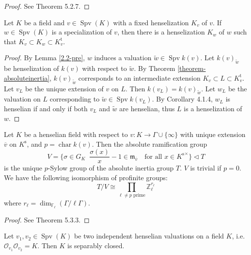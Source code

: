 \begin{proof}
See \cite{EP05} Theorem 5.2.7.
\end{proof}

\begin{lemma}\label{lemma-henselization-specialization}
Let $K$ be a field and $v\in\operatorname{Spv}(K)$ with a fixed henselization $K_v$ of $v$. If $w\in\operatorname{Spv}(K)$ is a specialization of $v$, then there is a henselization $K_w$ of $w$ such that $K_v\subset K_w\subset K_v^\text{t}$.
\end{lemma}

\begin{proof}
By Lemma \ref{2.2-pre}, $w$ induces a valuation $\tilde{w}\in\operatorname{Spv}k(v)$. Let $k(v)_{\tilde{w}}$ be henselization of $k(v)$ with respect to $\tilde{w}$. By Theorem \ref{theorem-absoluteinertia}, $k(v)_{\tilde{w}}$ corresponds to an intermediate extension $K_v\subset L \subset K^\text{t}_v$. Let $v_L$ be the unique extension of $v$ on $L$. Then $k(v_L)=k(v)_{\tilde{w}}$. Let $w_L$ be the valuation on $L$ corresponding to $\tilde{w}\in \operatorname{Spv} k(v_L)$. By \cite{EP05} Corollary 4.1.4, $w_L$ is henselian if and only if both $v_L$ and $\tilde{w}$ are henselian, thus $L$ is a henselization of $w$.
\end{proof}

\begin{theorem}\label{theorem-sylowgroups-inertiagroup}
Let $K$ be a henselian field with respect to $v:K\to\Gamma\cup\{\infty\}$ with unique extension $\overline{v}$ on $K^\text{s}$, and $p=\operatorname{char}k(v)$. Then the absolute ramification group
\[ V = \Big\{ \sigma\in G_K\mathop{\Big|} \frac{\sigma(x)}{x}-1\in\mathfrak{m}_{\overline{v}}\quad \text{for all }x\in {K^\text{s}}^\times \Big\} \lhd T \]
is the unique $p$-Sylow group of the absolute inertia group $T$. $V$ is trivial if $p=0$. We have the following isomorphism of profinite groups:
\[ T/V \cong \prod_{\ell\neq p\text{ prime}}\mathbb{Z}_\ell^{r_\ell} \]
where $r_\ell = \dim_{\mathbb{F}_\ell}(\Gamma/\ell\Gamma)$.
\end{theorem}

\begin{proof}
See \cite{EP05} Theorem 5.3.3.
\end{proof}

\begin{theorem}\label{theorem-fkschmidt}
Let $v_1,v_2\in\operatorname{Spv}(K)$ be two independent henselian valuations on a field $K$, i.e. $\mathcal{O}_{v_1}\mathcal{O}_{v_2}=K$. Then $K$ is separably closed.
\end{theorem}

